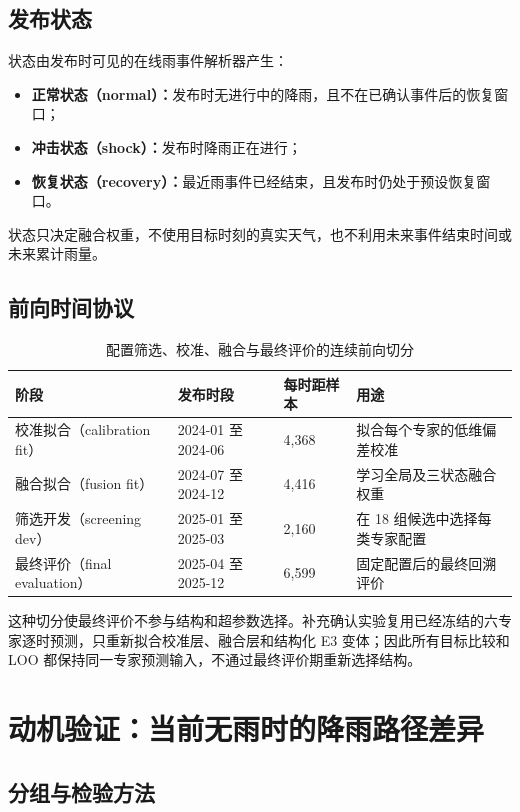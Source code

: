 \documentclass[UTF8,11pt,a4paper]{ctexart}
\begin{document}
\subsection{发布状态}

状态由发布时可见的在线雨事件解析器产生：
\begin{itemize}
  \item \textbf{正常状态（normal）：}发布时无进行中的降雨，且不在已确认事件后的恢复窗口；
  \item \textbf{冲击状态（shock）：}发布时降雨正在进行；
  \item \textbf{恢复状态（recovery）：}最近雨事件已经结束，且发布时仍处于预设恢复窗口。
\end{itemize}
状态只决定融合权重，不使用目标时刻的真实天气，也不利用未来事件结束时间或未来累计雨量。

\subsection{前向时间协议}

\begin{table}[H]
\centering
\caption{配置筛选、校准、融合与最终评价的连续前向切分}
\label{tab:splits}
\begin{tabularx}{0.92\textwidth}{lllX}
\toprule
阶段 & 发布时段 & 每时距样本 & 用途\\
\midrule
校准拟合（calibration fit） & 2024-01 至 2024-06 & 4,368 & 拟合每个专家的低维偏差校准\\
融合拟合（fusion fit） & 2024-07 至 2024-12 & 4,416 & 学习全局及三状态融合权重\\
筛选开发（screening dev） & 2025-01 至 2025-03 & 2,160 & 在 18 组候选中选择每类专家配置\\
最终评价（final evaluation） & 2025-04 至 2025-12 & 6,599 & 固定配置后的最终回溯评价\\
\bottomrule
\end{tabularx}
\end{table}

这种切分使最终评价不参与结构和超参数选择。补充确认实验复用已经冻结的六专家逐时预测，只重新拟合校准层、融合层和结构化 E3 变体；因此所有目标比较和 LOO 都保持同一专家预测输入，不通过最终评价期重新选择结构。

\section{动机验证：当前无雨时的降雨路径差异}
\label{sec:motivation}

\subsection{分组与检验方法}
\end{document}
